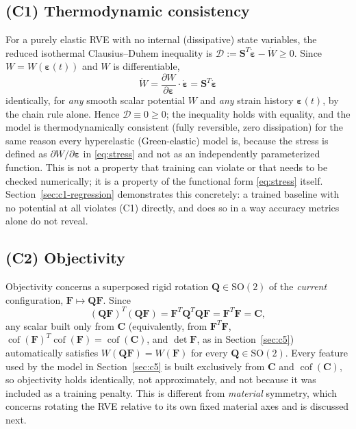 \documentclass[10pt,a4paper]{article}
\newcommand{\Cof}{\operatorname{cof}}
\newcommand{\SO}{\mathrm{SO}(2)}
\begin{document}
\subsection{(C1) Thermodynamic consistency}
\label{sec:c1}
For a purely elastic RVE with no internal (dissipative) state variables,
the reduced isothermal Clausius--Duhem inequality is
$\mathcal D:=\bm S^T\dot{\bm\varepsilon}-\dot W\geq0$.  Since
$W=W(\bm\varepsilon(t))$ and $W$ is differentiable,
\begin{equation}
 \dot W=\frac{\partial W}{\partial\bm\varepsilon}\cdot\dot{\bm\varepsilon}
 =\bm S^T\dot{\bm\varepsilon}
\end{equation}
identically, for \emph{any} smooth scalar potential $W$ and \emph{any}
strain history $\bm\varepsilon(t)$, by the chain rule alone.  Hence
$\mathcal D\equiv0\geq0$; the inequality holds with equality, and the
model is thermodynamically consistent (fully reversible, zero
dissipation) for the same reason every hyperelastic (Green-elastic) model
is, because the stress is defined as $\partial W/\partial\bm\varepsilon$
in \eqref{eq:stress} and not as an independently parameterized function.
This is not a property that training can violate or that needs to be
checked numerically; it is a property of the functional form
\eqref{eq:stress} itself. Section~\ref{sec:c1-regression} demonstrates
this concretely: a trained baseline with no potential at all violates
(C1) directly, and does so in a way accuracy metrics alone do not reveal.

\subsection{(C2) Objectivity}
\label{sec:c2}
Objectivity concerns a superposed rigid rotation $\bm Q\in\SO$ of the
\emph{current} configuration, $\bm F\mapsto\bm Q\bm F$.  Since
\begin{equation}
 (\bm Q\bm F)^T(\bm Q\bm F)=\bm F^T\bm Q^T\bm Q\bm F=\bm F^T\bm F=\bm C,
\end{equation}
any scalar built only from $\bm C$ (equivalently, from $\bm F^T\bm F$, $\Cof(\bm F)^T\Cof(\bm F)=\Cof(\bm C)$,
and $\det \bm F$, as in Section~\ref{sec:c5}) automatically satisfies
$W(\bm Q\bm F)=W(\bm F)$ for every $\bm Q\in\SO$.  Every feature used by the model in
Section~\ref{sec:c5} is built exclusively from $\bm C$ and $\Cof(\bm C)$, so
objectivity holds identically, not approximately, and not because it was
included as a training penalty.  This is different from \emph{material}
symmetry, which concerns rotating the RVE relative to its own fixed
material axes and is discussed next.
\end{document}
